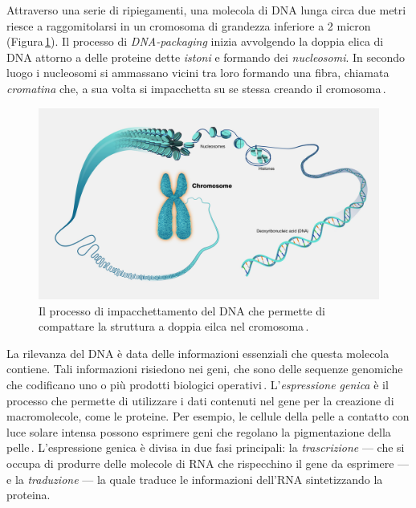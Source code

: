 Attraverso una serie di ripiegamenti, una molecola di DNA lunga circa due metri riesce a raggomitolarsi in un cromosoma di grandezza inferiore a 2 micron (Figura\,\ref{fig:dna-packaging}). Il processo di \textit{DNA-packaging} inizia avvolgendo la doppia elica di DNA attorno a delle proteine dette \textsl{istoni} e formando dei \textsl{nucleosomi}. In secondo luogo i nucleosomi si ammassano vicini tra loro formando una fibra, chiamata \textsl{cromatina} che, a sua volta si impacchetta su se stessa creando il cromosoma\,\cite{jansen2011nucleosome, zheng2010packaging}.

\begin{figure}[b!]
    \centering
    \includegraphics[width=\textwidth]{assets/dna-packaging.jpg}
    \caption[Il processo di impacchettamento del DNA.]{Il processo di impacchettamento del DNA che permette di compattare la struttura a doppia eilca nel cromosoma\,\cite{nhgri_chromosome_image}.}\label{fig:dna-packaging}
\end{figure}

La rilevanza del DNA è data delle informazioni essenziali che questa molecola contiene. Tali informazioni risiedono nei geni, che sono delle sequenze genomiche che codificano uno o più prodotti biologici operativi\,\cite{gerstein2007gene}. L'\textsl{espressione genica} è il processo che permette di utilizzare i dati contenuti nel gene per la creazione di macromolecole, come le proteine. Per esempio, le cellule della pelle a contatto con luce solare intensa possono esprimere geni che regolano la pigmentazione della pelle\,\cite{white2009gene}. L'espressione genica è divisa in due fasi principali: la \textsl{trascrizione} — che si occupa di produrre delle molecole di RNA che rispecchino il gene da esprimere — e la \textsl{traduzione} — la quale traduce le informazioni dell'RNA sintetizzando la proteina.

